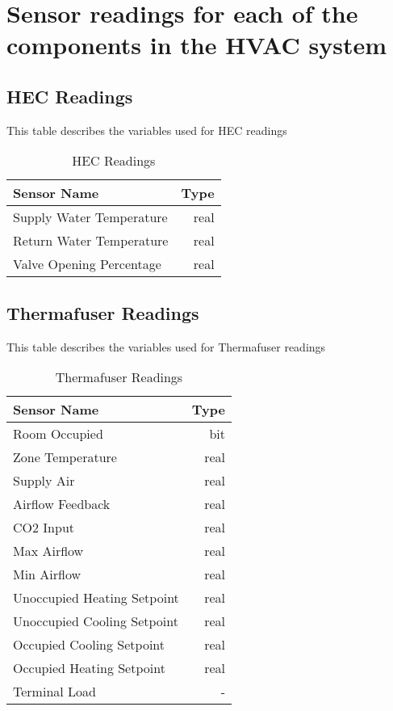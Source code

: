 \section{Sensor readings for each of the components in the HVAC system}
\label{section:appendixA}

\subsection{HEC Readings}

This table describes the variables used for HEC readings

\begin{table}[!htb]
\centering
\begin{tabular}{| l r |}
	\hline
	\textbf{Sensor Name}           & \textbf{Type} \\ 
  	\hline
Supply Water Temperature & real \\
Return Water Temperature & real \\
Valve Opening Percentage & real \\
  	\hline
\end{tabular}
\caption{HEC Readings}
\label{table:hec_readings}
\end{table}

\subsection{Thermafuser Readings}

This table describes the variables used for Thermafuser readings

\begin{table}[!htb]
\centering
\begin{tabular}{| l r |}
	\hline
	\textbf{Sensor Name}           & \textbf{Type} \\ 
  	\hline
Room Occupied               & bit  \\
Zone Temperature            & real \\
Supply Air                  & real \\
Airflow Feedback            & real \\
CO2 Input                   & real \\
Max Airflow                 & real \\
Min Airflow                 & real \\
Unoccupied Heating Setpoint & real \\
Unoccupied Cooling Setpoint & real \\
Occupied Cooling Setpoint   & real \\
Occupied Heating Setpoint   & real \\
Terminal Load               & -   \\
  	\hline
\end{tabular}
\caption{Thermafuser Readings}
\label{table:thermafuser_readings}
\end{table}

